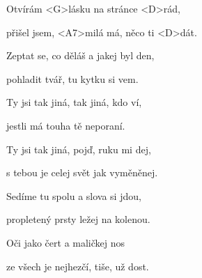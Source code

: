 

\zs
Otvírám <G>lásku na stránce <D>rád,

přišel jsem, <A7>milá má, něco ti <D>dát.

Zeptat se, co děláš a jakej byl den,

pohladit tvář, tu kytku si vem.
\ks

\zr
Ty jsi tak jiná, tak jiná, kdo ví,

jestli má touha tě neporaní.

Ty jsi tak jiná, pojď, ruku mi dej,

s tebou je celej svět jak vyměněnej.
\kr

\zs
Sedíme tu spolu a slova si jdou,

propletený prsty ležej na kolenou.

Oči jako čert a maličkej nos

ze všech je nejhezčí, tiše, už dost.
\ks

\zr
\kr

\kp





